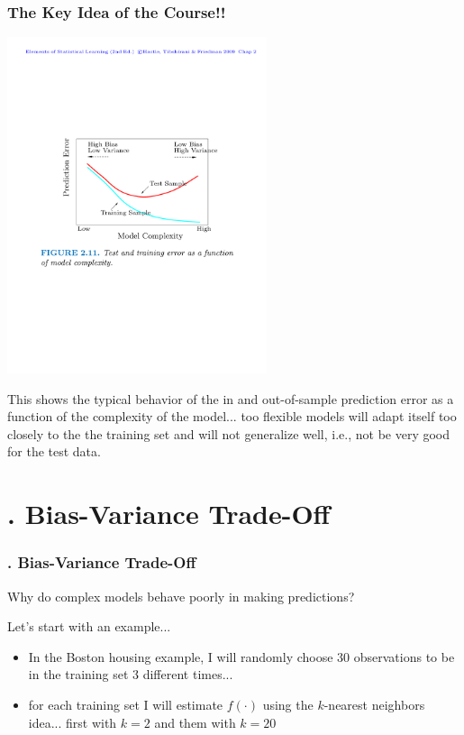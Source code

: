 \documentclass[flegn]{beamer}
\newcommand{\skoo}{\vspace{.2in}}
\begin{document}
\begin{frame}
\frametitle{The Key Idea of the Course!!}

\vspace{-0.8cm}
\begin{center}
\includegraphics[width=3in]{ESL_2-11}
\end{center}

\vspace{-0.2cm}
This shows the typical behavior of the in and out-of-sample prediction error as a function of the complexity of the model... too flexible models will adapt itself too closely to the the training set and will not generalize well, i.e., not be very good for the test data.
\end{frame}


\section{. Bias-Variance Trade-Off}
\begin{frame}
\frametitle{. Bias-Variance Trade-Off}
{\color{red}
Why do complex models behave poorly in making predictions?  
}

\skoo
Let's start with an example...

\begin{itemize}
\item In the Boston housing example, I will randomly choose 30 observations to be in the training set 3 different times... 
\item for each training set I will estimate $f(\cdot)$ using the $k$-nearest neighbors idea...  first with $k=2$ and them with $k=20$
\end{itemize}

\end{frame}
\end{document}
